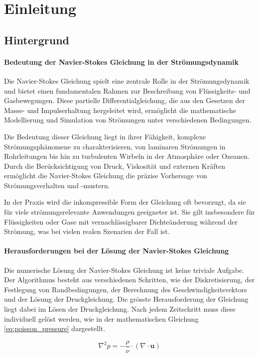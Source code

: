 \section{Einleitung}
\subsection{Hintergrund}
\paragraph{Bedeutung der Navier-Stokes Gleichung in der Strömungsdynamik}
Die Navier-Stokes Gleichung spielt eine zentrale Rolle in der Strömungsdynamik und bietet einen fundamentalen Rahmen zur Beschreibung von Flüssigkeits- und Gasbewegungen. Diese partielle Differentialgleichung, die aus den Gesetzen der Masse- und Impulserhaltung hergeleitet wird, ermöglicht die mathematische Modellierung und Simulation von Strömungen unter verschiedenen Bedingungen. 

Die Bedeutung dieser Gleichung liegt in ihrer Fähigkeit, komplexe Strömungsphänomene zu charakterisieren, von laminaren Strömungen in Rohrleitungen bis hin zu turbulenten Wirbeln in der Atmosphäre oder Ozeanen. Durch die Berücksichtigung von Druck, Viskosität und externen Kräften ermöglicht die Navier-Stokes Gleichung die präzise Vorhersage von Strömungsverhalten und -mustern.

In der Praxis wird die inkompressible Form der Gleichung oft bevorzugt, da sie für viele strömungsrelevante Anwendungen geeigneter ist. Sie gilt insbesondere für Flüssigkeiten oder Gase mit vernachlässigbarer Dichteänderung während der Strömung, was bei vielen realen Szenarien der Fall ist.

\paragraph{Herausforderungen bei der Lösung der Navier-Stokes Gleichung}
Die numerische Lösung der Navier-Stokes Gleichung ist keine triviale Aufgabe. Der Algorithmus besteht aus verschiedenen Schritten, wie der Diskretisierung, der Festlegung von Randbedingungen, der Berechnung des Geschwindigkeitsvektors und der Lösung der Druckgleichung. Die grösste Herausforderung der Gleichung liegt dabei im Lösen der Druckgleichung. Nach jedem Zeitschritt muss diese individuell gelöst werden, wie in der mathematischen Gleichung \ref{eq:poisson_pressure} dargestellt.

\begin{equation}
\nabla^2 p = -\frac{\rho}{\nu} \cdot \left(\nabla \cdot \mathbf{u} \right)\label{eq:poisson_pressure}
\end{equation}

